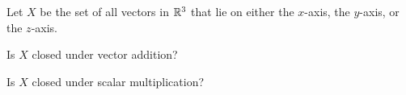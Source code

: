 \documentclass{ximera}
\begin{document}
\begin{problem}
 Let $X$ be the set of all vectors in $\mathbb{R}^3$ that lie on either the $x$-axis, the $y$-axis, or the $z$-axis.    
 	\begin{problem}\label{pr:R^3axes1}
  Is $X$ closed under vector addition?
  
  \begin{multipleChoice}
 \end{multipleChoice}
 
 	\end{problem}
 	\begin{problem}\label{pr:R^3axes2}
 Is $X$ closed under scalar multiplication?
 
 \begin{multipleChoice}
 \end{multipleChoice}
 	\end{problem}
 \end{problem}
\end{document}
